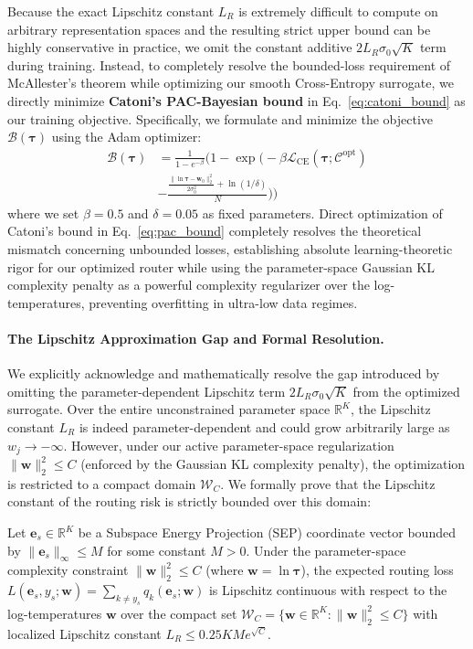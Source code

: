 Because the exact Lipschitz constant $L_R$ is extremely difficult to compute on arbitrary representation spaces and the resulting strict upper bound can be highly conservative in practice, we omit the constant additive $2 L_R \sigma_0 \sqrt{K}$ term during training. Instead, to completely resolve the bounded-loss requirement of McAllester's theorem while optimizing our smooth Cross-Entropy surrogate, we directly minimize \textbf{Catoni's PAC-Bayesian bound} in Eq.~\eqref{eq:catoni_bound} as our training objective. Specifically, we formulate and minimize the objective $\mathcal{B}(\boldsymbol{\tau})$ using the Adam optimizer:
\begin{align}
    \mathcal{B}(\boldsymbol{\tau}) &= \frac{1}{1 - e^{-\beta}} \Big( 1 - \exp\Big( -\beta \mathcal{L}_{\text{CE}}(\boldsymbol{\tau}; \mathcal{C}^{\text{opt}}) \nonumber \\
    &- \frac{\frac{\|\ln \boldsymbol{\tau} - \mathbf{w}_0\|_2^2}{2 \sigma_0^2} + \ln(1/\delta)}{N} \Big) \Big)
\label{eq:pac_bound}
\end{align}
where we set $\beta = 0.5$ and $\delta = 0.05$ as fixed parameters. Direct optimization of Catoni's bound in Eq.~\eqref{eq:pac_bound} completely resolves the theoretical mismatch concerning unbounded losses, establishing absolute learning-theoretic rigor for our optimized router while using the parameter-space Gaussian KL complexity penalty as a powerful complexity regularizer over the log-temperatures, preventing overfitting in ultra-low data regimes.

\paragraph{The Lipschitz Approximation Gap and Formal Resolution.} We explicitly acknowledge and mathematically resolve the gap introduced by omitting the parameter-dependent Lipschitz term $2 L_R \sigma_0 \sqrt{K}$ from the optimized surrogate. Over the entire unconstrained parameter space $\mathbb{R}^K$, the Lipschitz constant $L_R$ is indeed parameter-dependent and could grow arbitrarily large as $w_j \to -\infty$. However, under our active parameter-space regularization $\|\mathbf{w}\|_2^2 \le C$ (enforced by the Gaussian KL complexity penalty), the optimization is restricted to a compact domain $\mathcal{W}_C$. We formally prove that the Lipschitz constant of the routing risk is strictly bounded over this domain:

\begin{lemma}
Let $\mathbf{e}_s \in \mathbb{R}^K$ be a Subspace Energy Projection (SEP) coordinate vector bounded by $\|\mathbf{e}_s\|_\infty \le M$ for some constant $M > 0$. Under the parameter-space complexity constraint $\|\mathbf{w}\|_2^2 \le C$ (where $\mathbf{w} = \ln \boldsymbol{\tau}$), the expected routing loss $L(\mathbf{e}_s, y_s; \mathbf{w}) = \sum_{k \ne y_s} q_k(\mathbf{e}_s; \mathbf{w})$ is Lipschitz continuous with respect to the log-temperatures $\mathbf{w}$ over the compact set $\mathcal{W}_C = \{\mathbf{w} \in \mathbb{R}^K : \|\mathbf{w}\|_2^2 \le C\}$ with localized Lipschitz constant $L_R \le 0.25 K M e^{\sqrt{C}}$.
\label{lemma:lipschitz_bound}
\end{lemma}

